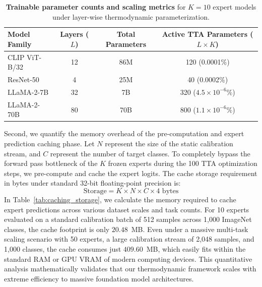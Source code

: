 \documentclass{article}
\theoremstyle{plain}
\theoremstyle{definition}
\theoremstyle{remark}
\begin{document}
\begin{table}[t]
\centering
\caption{\textbf{Trainable parameter counts and scaling metrics} for $K=10$ expert models under layer-wise thermodynamic parameterization.}
\label{tab:scaling_params}
\vskip 0.1in
\begin{small}
\begin{sc}
\begin{tabular}{lccc}
\toprule
Model Family & Layers ($L$) & Total Parameters & Active TTA Parameters ($L \times K$) \\
\midrule
CLIP ViT-B/32 & 12 & 86M & 120 (0.0001\%) \\
ResNet-50     & 4  & 25M & 40 (0.0002\%) \\
LLaMA-2-7B    & 32 & 7B  & 320 ($4.5 \times 10^{-6}\%$) \\
LLaMA-2-70B   & 80 & 70B & 800 ($1.1 \times 10^{-6}\%$) \\
\bottomrule
\end{tabular}
\end{sc}
\end{small}
\vskip -0.1in
\end{table}

Second, we quantify the memory overhead of the pre-computation and expert prediction caching phase. Let $N$ represent the size of the static calibration stream, and $C$ represent the number of target classes. To completely bypass the forward pass bottleneck of the $K$ frozen experts during the 100 TTA optimization steps, we pre-compute and cache the expert logits. The cache storage requirement in bytes under standard 32-bit floating-point precision is:
\begin{equation}
\text{Storage} = K \times N \times C \times 4 \text{ bytes}
\end{equation}
In Table~\ref{tab:caching_storage}, we calculate the memory required to cache expert predictions across various dataset scales and task counts. For 10 experts evaluated on a standard calibration batch of 512 samples across 1,000 ImageNet classes, the cache footprint is only $20.48$~MB. Even under a massive multi-task scaling scenario with 50 experts, a large calibration stream of 2,048 samples, and 1,000 classes, the cache consumes just $409.60$~MB, which easily fits within the standard RAM or GPU VRAM of modern computing devices. This quantitative analysis mathematically validates that our thermodynamic framework scales with extreme efficiency to massive foundation model architectures.
\end{document}
